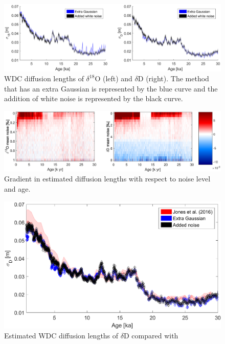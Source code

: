 \documentclass[draft, jgrga]{AGUTeX}
\begin{document}

\newpage


\begin{figure}
	\includegraphics[width=\linewidth]{WAIS_diffusion_adding_noise.eps}
	\caption{WDC diffusion lengths of $\delta^{18}$O (left) and $\delta$D (right).
		The method that has an extra Gaussian is represented by the blue curve and
		the addition of white noise is represented by the black curve.} \label{WAIS_diffusion_adding_noise}
\end{figure}

\begin{figure}
	\includegraphics[width=\linewidth]{added_noise_sensitivity.eps}
	\caption{Gradient in estimated diffusion lengths with respect to noise level and age.} \label{added_noise_sensitivity}
\end{figure}

\begin{figure}
	\includegraphics[width=.9\linewidth]{WAIS_diffusion_lengths.eps}
	\caption{Estimated WDC diffusion lengths of $\delta$D compared with \cite{Jones2016}} \label{WAIS_diffusion_lengths}
\end{figure}
\end{document}
